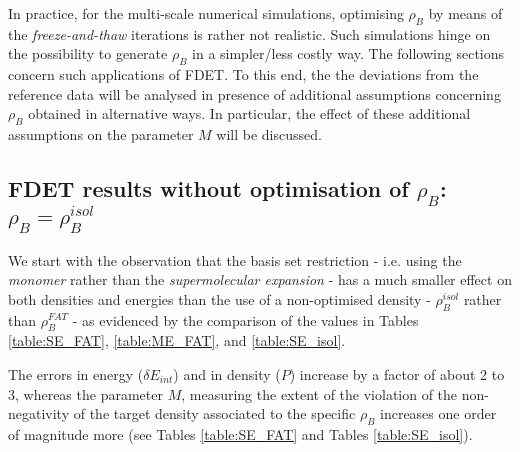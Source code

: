 \documentclass[journal=jctcce,manuscript=article]{achemso}
\newcommand{\nr}[1]{\color{red}#1\color{black}}
\begin{document}
In practice, for the multi-scale numerical simulations,  optimising 
$\rho_B$ by means of the {\it freeze-and-thaw} iterations is rather not realistic. Such simulations hinge on the possibility to generate $\rho_B$ 
in a simpler/less costly way. 
The \nr{following } sections concern such applications of FDET. 
To this end, the the deviations from the reference data will be analysed in presence of additional assumptions concerning $\rho_B$ obtained in alternative ways. In particular, the effect of these additional assumptions on the parameter $M$ will be discussed.
\subsection{FDET results without optimisation of $\rho_B$: $\rho_B=\rho_B^{isol}$}
\nr{We start with the observation that the basis set restriction - i.e. using the {\it monomer} rather than the {\it supermolecular expansion} - has a much smaller effect on both densities and energies than the use of a non-optimised density - $\rho_B^{isol}$ rather than $\rho_B^{FAT}$ - as evidenced by the comparison of the values in Tables \ref{table:SE_FAT},  \ref{table:ME_FAT}, and \ref{table:SE_isol}}.

The errors in energy ($\delta E_{int}$) and in density ($P$) increase   by a factor of about 2 to 3, whereas \nr{the parameter } $M$, measuring the exten\nr{t } of the violation of the non-negativity of the target density \nr{associated to the specific } $\rho_B$ increases  one order of magnitude more (see Tables \ref{table:SE_FAT} and Tables \ref{table:SE_isol}). 
\end{document}
